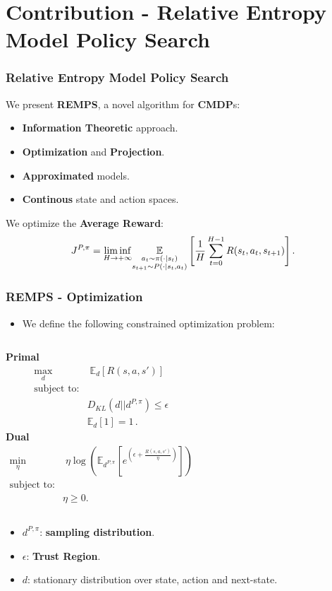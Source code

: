 \documentclass[english,aspectratio=1610]{beamer}
\newcommand{\sas}{\int_\mathcal{S} \int_\mathcal{A} \int_\mathcal{S}}
\theoremstyle{mystyle}
\theoremstyle{mystyle}
\theoremstyle{mystyle}
\begin{document}
\section{Contribution - Relative Entropy Model Policy Search}
\begin{frame}[t]
\frametitle{Relative Entropy Model Policy Search}
We present \textbf{REMPS}, a novel algorithm for \textbf{CMDP}s:
\vspace{1em}
\begin{itemize}
	\item \textbf{Information Theoretic} approach.
	\item \textbf{Optimization} and \textbf{Projection}.
	\item \textbf{Approximated} models.
	\item \textbf{Continous} state and action spaces.
\end{itemize}
	We optimize the \textbf{Average Reward}:
	$$
J^{P,\pi} = \underset{H \rightarrow + \infty}{\lim \inf} \underset{\begin{subarray}{c}
	a_t \sim \pi(\cdot | s_t) \\
	s_{t+1} \sim P(\cdot | s_t, a_t)
\end{subarray}}{\mathbb{E}} \left[ \frac{1}{H} \sum_{t=0}^{H-1} R(s_t,a_t,s_{t+1}) \right] .
$$

\end{frame}

\begin{frame}
\frametitle{REMPS - Optimization}
\begin{itemize}
	\item  We define the following constrained optimization problem:
\end{itemize}
\begin{columns}[T]
\centering
\textbf{Primal}
\begin{align*}
	\max_{d} & \; \mathbb{E}_{d} [R(s,a,s')] \\
	\text{subject to:} &\\
	& D_{KL}(d || d^{P,\pi}) 
	\leq \epsilon \\
	& \mathbb{E}_{d} [1] = 1 \, .
\end{align*}
\centering
\textbf{Dual}
\begin{align*}
	\min_{\eta} & \; \eta \log \left( \mathbb{E}_{d^{P,\pi}} \left[ e^{\left(\epsilon + \frac{R(s,a,s')}{\eta} \right)}\right] \right) \\
	\text{subject to:} &\\
	& \eta \geq 0.	
	\label{eq:remps-dual}
\end{align*}
\end{columns}
\begin{itemize}
\item $d^{P,\pi}$: \textbf{sampling distribution}.
\item $\epsilon$: \textbf{Trust Region}.
\item $d$: stationary distribution over state, action and next-state.
\end{itemize}
\end{frame}
\end{document}
